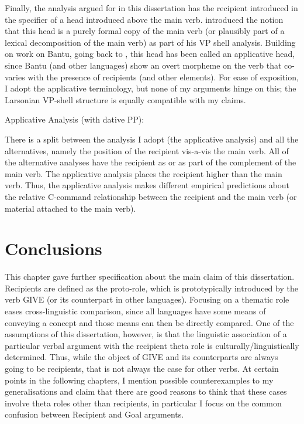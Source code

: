 Finally, the analysis argued for in this dissertation has the recipient introduced in the specifier of a head introduced above the main verb. \cite{Larson.1988} introduced the notion that this head is a purely formal copy of the main verb (or plausibly part of a lexical decomposition of the main verb) as part of his VP shell analysis. Building on work on Bantu, going back to \cite{Baker.1988b}, this head has been called an applicative head, since Bantu (and other languages) show an overt morpheme on the verb that co-varies with the presence of recipients (and other elements). For ease of exposition, I adopt the applicative terminology, but none of my arguments hinge on this; the Larsonian VP-shell structure is equally compatible with my claims.

\begin{exe}
	\ex Applicative Analysis (with dative PP):\\

\end{exe}

There is a split between the analysis I adopt (the applicative analysis) and all the alternatives, namely the position of the recipient vis-a-vis the main verb. All of the alternative analyses have the recipient as or as part of the complement of the main verb. The applicative analysis places the recipient higher than the main verb. Thus, the applicative analysis makes different empirical predictions about the relative C-command relationship between the recipient and the main verb (or material attached to the main verb).

\section{Conclusions}
This chapter gave further specification about the main claim of this dissertation. Recipients are defined as the proto-role, which is prototypically introduced by the verb GIVE (or its counterpart in other languages). Focusing on a thematic role eases cross-linguistic comparison, since all languages have some means of conveying a concept and those means can then be directly compared. One of the assumptions of this dissertation, however, is that the linguistic association of a particular verbal argument with the recipient theta role is culturally/linguistically determined. Thus, while the object of GIVE and its counterparts are always going to be recipients, that is not always the case for other verbs. At certain points in the following chapters, I mention possible counterexamples to my generalisations and claim that there are good reasons to think that these cases involve theta roles other than recipients, in particular I focus on the common confusion between Recipient and Goal arguments.

